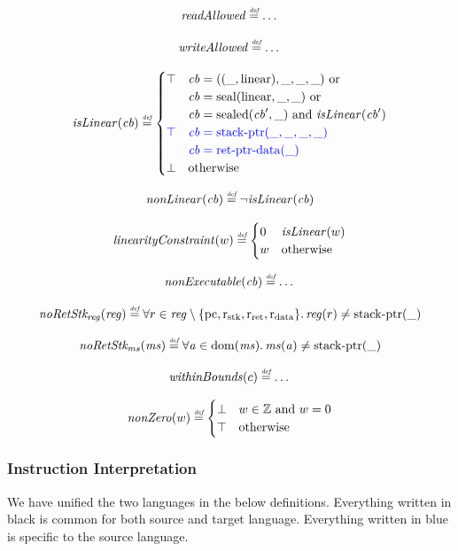 \documentclass[a4paper]{article}
\newcommand{\defeq}{\stackrel{\textit{\tiny{def}}}{=}}
\newcommand{\dom}{\mathrm{dom}}
\newcommand{\tand}{\text{ and }}
\newcommand{\tor}{\text{ or }}
\newcommand{\totherwise}{\text{otherwise }}
\newcommand{\sourcecolor}[1]{\color{blue}}
\newcommand{\src}[1]{{\sourcecolor{} #1}}
\newcommand{\ints}{\mathbb{Z}}
\newcommand{\shareddom}[1]{\mathrm{#1}}
\newcommand{\stkptr}[1]{\mathrm{stack\text{-}ptr}(#1)}
\newcommand{\retptrd}{\mathrm{ret\text{-}ptr\text{-}data}}
\newcommand{\seal}[1]{\shareddom{seal}(#1)}
\newcommand{\sealed}[1]{\shareddom{sealed}(#1)}
\newcommand{\var}[1]{\mathit{#1}}
\newcommand{\reg}{\var{reg}}
\newcommand{\ms}{\var{ms}}
\newcommand{\cb}{\var{cb}}
\newcommand{\aaddr}{\var{a}}
\newcommand{\pcreg}{\mathrm{pc}}
\newcommand{\rstk}{\mathrm{r}_\mathrm{stk}}
\newcommand{\rO}{\mathrm{r}_\mathrm{ret}}
\newcommand{\rret}{\rO}
\newcommand{\rdata}{\mathrm{r}_\mathrm{data}}
\newcommand{\plainlinearity}[1]{\mathrm{#1}}
\newcommand{\linear}{\plainlinearity{linear}}
\newcommand{\plainfun}[2]{
  \ifthenelse{\equal{#2}{}}
  {\mathit{#1}}
  {\mathit{#1}(#2)}
}
\newcommand{\nonExec}[1]{\plainfun{nonExecutable}{#1}}
\newcommand{\readAllowed}[1]{\plainfun{readAllowed}{#1}}
\newcommand{\writeAllowed}[1]{\plainfun{writeAllowed}{#1}}
\newcommand{\nonLinear}[1]{\plainfun{nonLinear}{#1}}
\newcommand{\linCons}[1]{\plainfun{linearityConstraint}{#1}}
\newcommand{\isLinear}[1]{\plainfun{isLinear}{#1}}
\newcommand{\noRetStkReg}[1]{\plainfun{noRetStk_{reg}}{#1}}
\newcommand{\noRetStkMs}[1]{\plainfun{noRetStk_{ms}}{#1}}
\newcommand{\withinBounds}[1]{\plainfun{withinBounds}{#1}}
\newcommand{\nonZero}[1]{\plainfun{nonZero}{#1}}
\begin{document}
\[
  \readAllowed{} \defeq \dots
\]

\[
  \writeAllowed{} \defeq \dots
\]

\[
  \isLinear{\cb} \defeq
  \begin{cases}
    \top & 
    \arraycolsep=0pt
    \begin{array}[t]{l}
      \cb = ((\_,\linear),\_,\_,\_) \tor\\
      \cb = \seal{\linear,\_,\_} \tor\\
      \cb = \sealed{\cb',\_} \tand \isLinear{\cb'} 
    \end{array}\\
    \src{\top} & 
    \arraycolsep=0pt
    \begin{array}[t]{l}
      \src{\cb = \stkptr{\_,\_,\_,\_}}\\
      \src{\cb = \retptrd(\_)}
    \end{array}\\
    \bot & \totherwise
  \end{cases}
\]

\[
  \nonLinear{\cb} \defeq \neg \isLinear{\cb}
\]

\[
  \linCons{w} \defeq
  \begin{cases}
    0 & \isLinear{w} \\
    w & \totherwise
  \end{cases}
\]

\[
  \nonExec{\cb} \defeq \dots
\]


\[
  \noRetStkReg{\reg} \defeq \forall r \in \reg \setminus \{ \pcreg, \rstk, \rret, \rdata \} \ldotp \reg(r) \neq \stkptr{\_}
\]

\[
  \noRetStkMs{\ms} \defeq \forall \aaddr \in \dom(\ms) \ldotp \ms(\aaddr) \neq \stkptr{\_}
\]

\[
  \withinBounds{c} \defeq \dots
\]

\[
  \nonZero{w} \defeq
  \begin{cases}
    \bot & w \in \ints \tand w = 0 \\
    \top & \totherwise
  \end{cases}
\]

\subsubsection{Instruction Interpretation}
We have unified the two languages in the below definitions. Everything written in black is common for both source and target language. Everything written in \src{blue} is specific to the source language.
\end{document}
